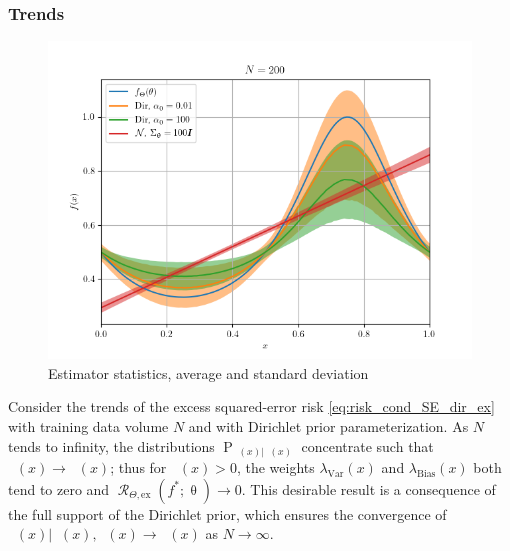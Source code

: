 \documentclass{article}
\DeclareMathOperator{\Prm}{\mathrm{P}}
\DeclareMathOperator{\Rcal}{\mathcal{R}}
\DeclareMathOperator{\thetam}{\theta_\text{m}}
\DeclareMathOperator{\upthetam}{\uptheta_\text{m}}
\DeclareMathOperator{\upthetac}{\uptheta_\text{c}}
\DeclareMathOperator{\uppsim}{\uppsi_\text{m}}
\DeclareMathOperator{\uppsic}{\uppsi_\text{c}}
\begin{document}
\subsubsection{Trends}

\begin{figure}
\centering
\includegraphics[width=1\linewidth]{SSP_2021/Predict_SE_biased_hard.png}
\caption{Estimator statistics, average and standard deviation}
\label{fig:Predict_SE_biased_hard}
\end{figure}

Consider the trends of the excess squared-error risk \eqref{eq:risk_cond_SE_dir_ex} with training data volume $N$ and with Dirichlet prior parameterization. As $N$ tends to infinity, the distributions $\Prm_{\uppsim(x) | \upthetam(x)}$ concentrate such that $\uppsim(x) \to \thetam(x)$; thus for $\thetam(x) > 0$, the weights $\lambda_{\text{Var}}(x)$ and $\lambda_{\text{Bias}}(x)$ both tend to zero and $\Rcal_{\Theta, \mathrm{ex}}(f^* ; \uptheta) \to 0$. This desirable result is a consequence of the full support of the Dirichlet prior, which ensures the convergence of $\upthetac(x) | \uppsim(x),\uppsic(x) \to \uppsic(x)$ as $N \to \infty$.
\end{document}
